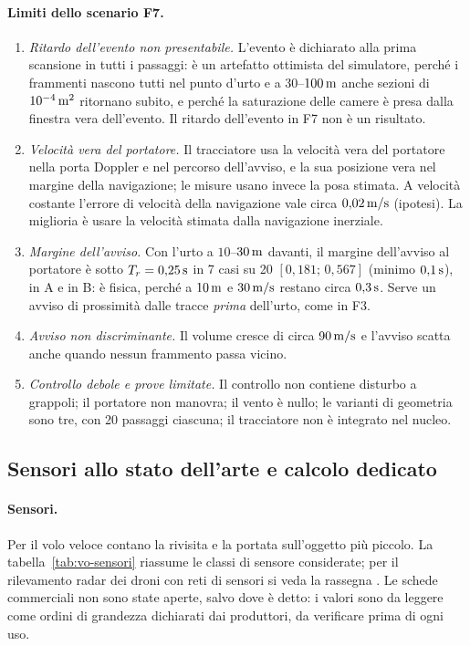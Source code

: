 \paragraph{Limiti dello scenario F7.}
\begin{enumerate}[label=\arabic*.]
\item \emph{Ritardo dell'evento non presentabile.} L'evento è dichiarato alla prima scansione in tutti i passaggi: è un artefatto ottimista del simulatore, perché i frammenti nascono tutti nel punto d'urto e a $30$--$100\,\mathrm{m}$ anche sezioni di $10^{-4}\,\mathrm{m^2}$ ritornano subito, e perché la saturazione delle camere è presa dalla finestra vera dell'evento. Il ritardo dell'evento in F7 non è un risultato.
\item \emph{Velocità vera del portatore.} Il tracciatore usa la velocità vera del portatore nella porta Doppler e nel percorso dell'avviso, e la sua posizione vera nel margine della navigazione; le misure usano invece la posa stimata. A velocità costante l'errore di velocità della navigazione vale circa $0{,}02\,\mathrm{m/s}$ (ipotesi). La miglioria è usare la velocità stimata dalla navigazione inerziale.
\item \emph{Margine dell'avviso.} Con l'urto a $10$--$30\,\mathrm{m}$ davanti, il margine dell'avviso al portatore è sotto $T_r=0{,}25\,\mathrm{s}$ in 7 casi su 20 $[0{,}181;\,0{,}567]$ (minimo $0{,}1\,\mathrm{s}$), in A e in B: è fisica, perché a $10\,\mathrm{m}$ e $30\,\mathrm{m/s}$ restano circa $0{,}3\,\mathrm{s}$. Serve un avviso di prossimità dalle tracce \emph{prima} dell'urto, come in F3.
\item \emph{Avviso non discriminante.} Il volume cresce di circa $90\,\mathrm{m/s}$ e l'avviso scatta anche quando nessun frammento passa vicino.
\item \emph{Controllo debole e prove limitate.} Il controllo non contiene disturbo a grappoli; il portatore non manovra; il vento è nullo; le varianti di geometria sono tre, con 20 passaggi ciascuna; il tracciatore non è integrato nel nucleo.
\end{enumerate}

\subsection{Sensori allo stato dell'arte e calcolo dedicato}\label{sec:vo-hw}

\paragraph{Sensori.} Per il volo veloce contano la rivisita e la portata sull'oggetto più piccolo. La tabella~\ref{tab:vo-sensori} riassume le classi di sensore considerate; per il rilevamento radar dei droni con reti di sensori si veda la rassegna \cite{coluccia2020}. Le schede commerciali non sono state aperte, salvo dove è detto: i valori sono da leggere come ordini di grandezza dichiarati dai produttori, da verificare prima di ogni uso.

